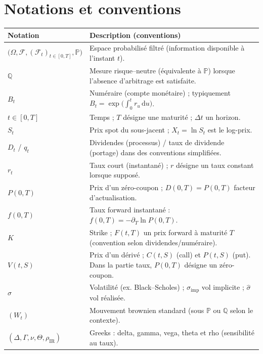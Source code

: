 \documentclass[11pt,a4paper]{article}
\newcommand{\dd}{\mathrm{d}}
\newcommand{\PP}{\mathbb{P}}
\newcommand{\QQ}{\mathbb{Q}}
\newcommand{\1}{\mathbf{1}}
\begin{document}
\tableofcontents
\newpage

\section*{Notations et conventions}

\begin{center}
\begin{tabularx}{\textwidth}{@{}lX@{}}
\toprule
\textbf{Notation} & \textbf{Description (conventions)} \\
\midrule
$\bigl(\Omega,\mathcal{F},(\mathcal{F}_t)_{t\in[0,T]},\PP\bigr)$ & Espace probabilis\'e filtr\'e (information disponible \`a l'instant $t$). \\
$\QQ$ & Mesure risque--neutre (\'equivalente \`a $\PP$) lorsque l'absence d'arbitrage est satisfaite. \\
$B_t$ & Num\'eraire (compte mon\'etaire) ; typiquement $B_t=\exp\!\bigl(\int_0^t r_u\,\dd u\bigr)$. \\
$t\in[0,T]$ & Temps ; $T$ d\'esigne une maturit\'e ; $\Delta t$ un horizon. \\
$S_t$ & Prix spot du sous-jacent ; $X_t=\ln S_t$ est le log-prix. \\
$D_t$ / $q_t$ & Dividendes (processus) / taux de dividende (portage) dans des conventions simplifi\'ees. \\
$r_t$ & Taux court (instantan\'e) ; $r$ d\'esigne un taux constant lorsque suppos\'e. \\
$P(0,T)$ & Prix d'un z\'ero-coupon ; $D(0,T)=P(0,T)$ facteur d'actualisation. \\
$f(0,T)$ & Taux forward instantan\'e : $f(0,T)=-\partial_T \ln P(0,T)$. \\
$K$ & Strike ; $F(t,T)$ un prix forward \`a maturit\'e $T$ (convention selon dividendes/num\'eraire). \\
$V(t,S)$ & Prix d'un d\'eriv\'e ; $C(t,S)$ (call) et $P(t,S)$ (put). Dans la partie taux, $P(0,T)$ d\'esigne un z\'ero-coupon. \\
$\sigma$ & Volatilit\'e (ex. Black--Scholes) ; $\sigma_{\mathrm{imp}}$ vol implicite ; $\widehat\sigma$ vol r\'ealis\'ee. \\
$(W_t)$ & Mouvement brownien standard (sous $\PP$ ou $\QQ$ selon le contexte). \\
$(\Delta,\Gamma,\nu,\Theta,\rho_{\mathrm{IR}})$ & Greeks : delta, gamma, vega, theta et rho (sensibilit\'e au taux). \\

\end{tabularx}
\end{center}
\end{document}

